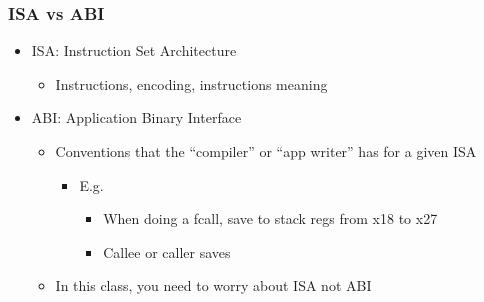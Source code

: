\documentclass[12pt]{article}
\begin{document}
            \subsubsection{ISA vs ABI}
                \begin{itemize}
                    \item {ISA: Instruction Set Architecture}
                        \begin{itemize}
                            \item {Instructions, encoding, instructions meaning}
                        \end{itemize}
                    \item {ABI: Application Binary Interface}
                        \begin{itemize}
                            \item {Conventions that the “compiler” or “app writer” has for a given ISA}
                                \begin{itemize}
                                    \item {E.g.}
                                        \begin{itemize}
                                            \item {When doing a fcall, save to stack regs from x18 to x27}
                                            \item {Callee or caller saves}
                                        \end{itemize}
                                \end{itemize}
                            \item {In this class, you need to worry about ISA not ABI}
                        \end{itemize}
                \end{itemize}
                
\end{document}
